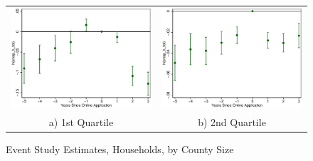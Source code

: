\documentclass[11pt,letterpaper]{article}
\begin{document}
\begin{figure}\caption{Event Study Estimates, Households, by County Size}
\begin{tabular}{cc}
\includegraphics[scale=0.57]{tabfig/evstu_size1_snap_h_tot_one_yrcfcttr_5_3}&\includegraphics[scale=0.57]{tabfig/evstu_size2_snap_h_tot_one_yrcfcttr_5_3}\\
a) 1st Quartile&b) 2nd Quartile\\

\end{tabular}
\end{figure}
\end{document}
